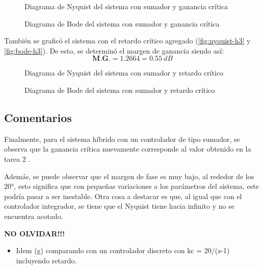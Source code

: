 \begin{figure}[h]
  \centering
  
  \caption{Diagrama de Nyquist del sistema con sumador y ganancia crítica}
  \label{fig:nyquist-h2}
\end{figure}

\begin{figure}[h]
  \centering
  
  \caption{Diagrama de Bode del sistema con sumador y ganancia crítica}
  \label{fig:bode-h2}
\end{figure}

También se graficó el sistema con el retardo crítico agregado (\autoref{fig:nyquist-h3} y
\autoref{fig:bode-h3}). De esto, se determinó el margen de ganancia siendo así:
\begin{equation}
  \boxed{\textbf{M.G.} = 1.2664 = 0.55\ \unit{dB}}
\end{equation}

\begin{figure}[h]
  \centering
  
  \caption{Diagrama de Nyquist del sistema con sumador y retardo crítico}
  \label{fig:nyquist-h3}
\end{figure}

\begin{figure}[h]
  \centering
  
  \caption{Diagrama de Bode del sistema con sumador y retardo crítico}
  \label{fig:bode-h3}
\end{figure}


\FloatBarrier
\subsection{Comentarios}

Finalmente, para el sistema híbrido con un controlador de tipo sumador, se observa que
la ganancia crítica nuevamente corresponde al valor obtenido en la tarea 2 \cite{tarea-2-sdc}.

Además, se puede observar que el margen de fase es muy bajo, al rededor de los
$\ang{20}$, esto significa que con pequeñas variaciones a los parámetros del
sistema, este podría pasar a ser inestable. Otra cosa a destacar es que, al igual
que con el controlador integrador, se tiene que el Nyquist tiene hacia infinito
y no se encuentra acotado.

\textbf{NO OLVIDAR!!!}


\begin{itemize}
  \item Idem (g) comparando con un controlador discreto con kc = 20/(z-1) incluyendo retardo.
\end{itemize}
